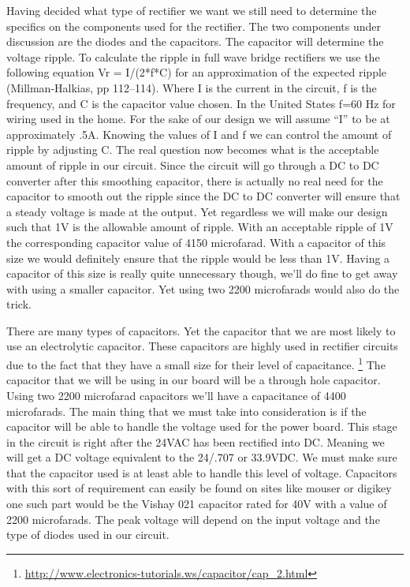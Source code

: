 Having decided what type of rectifier we want we still need to determine the
specifics on the components used for the rectifier. The two components under
discussion are the diodes and the capacitors. The capacitor will determine the
voltage ripple. To calculate the ripple in full wave bridge rectifiers we use
the following equation Vr = I/(2*f*C) for an approximation of the expected
ripple (Millman{}-Halkias, pp 112--114). Where I is the current in the circuit,
f is the frequency, and C is the capacitor value chosen. In the United States
f=60 Hz for wiring used in the home. For the sake of our design we will assume
{}``I{}'' to be at approximately .5A. Knowing the values of I and f we can
control the amount of ripple by adjusting C. The real question now becomes what
is the acceptable amount of ripple in our circuit. Since the circuit will go
through a DC to DC converter after this smoothing capacitor, there is actually
no real need for the capacitor to smooth out the ripple since the DC to DC
converter will ensure that a steady voltage is made at the output. Yet
regardless we will make our design such that 1V is the allowable amount of
ripple. With an acceptable ripple of 1V the corresponding capacitor value of
4150 microfarad. With a capacitor of this size we would definitely ensure that
the ripple would be less than 1V. Having a capacitor of this size is really
quite unnecessary though, we{}'ll do fine to get away with using a smaller
capacitor. Yet using two 2200 microfarads would also do the trick.

There are many types of capacitors. Yet the capacitor that we are most likely
to use an electrolytic capacitor. These capacitors are highly used in
rectifier circuits due to the fact that they have a small size for their level
of capacitance.
\footnote{\url{http://www.electronics-tutorials.ws/capacitor/cap_2.html}} The capacitor
that we will be using in our board will be a through hole capacitor. Using two
2200 microfarad capacitors we{}'ll have a capacitance of 4400 microfarads. The
main thing that we must take into consideration is if the capacitor will be
able to handle the voltage used for the power board. This stage in the circuit
is right after the 24VAC has been rectified into DC. Meaning we will get a DC
voltage equivalent to the 24/.707 or 33.9VDC. We must make sure that the
capacitor used is at least able to handle this level of voltage.
Capacitors with this sort of requirement can easily be found on sites like
mouser or digikey one such part would be the Vishay 021 capacitor rated for 40V
with a value of 2200 microfarads. The peak voltage will depend on the input
voltage and the type of diodes used in our circuit.


